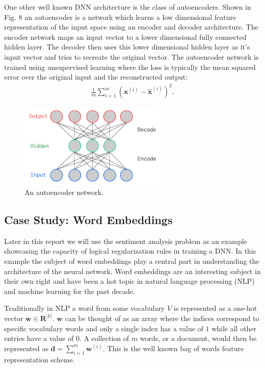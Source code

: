 \documentclass[11pt]{article}
\begin{document}
One other well known DNN architecture is the class of autoencoders.  Shown in Fig. 8 an autoencoder is a network which learns a low dimensional feature representation of the input space using an encoder and decoder architecture.  The encoder network maps an input vector to a lower dimensional fully connected hidden layer.  The decoder then uses this lower dimensional hidden layer as it's input vector and tries to recreate the original vector.  The autoencoder network is trained using unsupervised learning where the loss is typically the mean squared error over the original input and the reconstructed output: 
\begin{gather*}
\frac{1}{m} \sum_{i = 1}^{m} (\textbf{x}^{(i)} - \hat{\textbf{x}}^{(i)})^2.
\end{gather*}
\begin{figure}
	\begin{center}
		\includegraphics[height=4cm, width=7cm]{autoencoder}
	\end{center}
	\caption{An autoencoder network.}
\end{figure}

\subsection{Case Study: Word Embeddings}
Later in this report we will use the sentiment analysis problem as an example showcasing the capacity of logical regularization rules in training a DNN.  In this example the subject of word embeddings play a central part in understanding the architecture of the neural network.  Word embeddings are an interesting subject in their own right and have been a hot topic in natural language processing (NLP) and machine learning for the past decade.

Traditionally in NLP a word from some vocabulary $V$ is represented as a one-hot vector $\textbf{w} \in \mathbf{R}^{|V|}$.  $\textbf{w}$ can be thought of as an array where the indices correspond to specific vocabulary words and only a single index has a value of $1$ while all other entries have a value of $0$.  A collection of $m$ words, or a document, would then be represented as $\textbf{d} = \sum_{i=1}^{m} \textbf{w}^{(i)}$.  This is the well known bag of words feature representation scheme.
\end{document}
